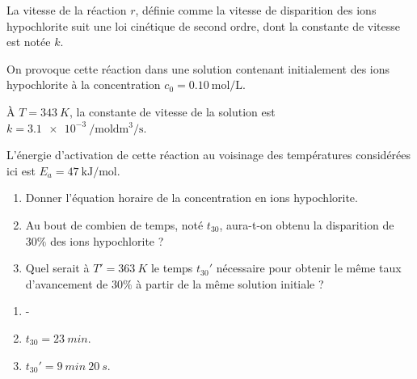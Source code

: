 La vitesse de la réaction $r$, définie comme la vitesse de disparition des ions hypochlorite  suit une loi cinétique de second ordre, dont la constante de vitesse est notée $k$.

On provoque cette réaction dans une solution contenant initialement des ions hypochlorite à la concentration $c_0 = \SI{0.10}{\mol\per\liter}$.

À $T = \SI{343}{K}$, la constante de vitesse de la solution est $k = \SI{3.1e-3}{\per\mol \deci \meter \cubed \per \second}$. 

L’énergie d’activation de cette réaction au voisinage des températures considérées ici est $E_a = \SI{47}{\kilo\joule\per\mol}$.

\begin{enumerate}
	\item Donner l’équation horaire de la concentration en ions hypochlorite.
	\item Au bout de combien de temps, noté $t_{30}$, aura-t-on obtenu la disparition de $30\%$ des ions hypochlorite ?
	\item Quel serait à $T' = \SI{363}{K}$ le temps $t_{30}'$ nécessaire pour obtenir le même taux d'avancement de $30 \%$ à partir de la même solution initiale ?
\end{enumerate}

\begin{enumerate}
	\item -
	\item $t_{30} = \SI{23}{min}$.
	\item $t_{30}' = \SI{9}{min}~\SI{20}{s}$.
\end{enumerate}


